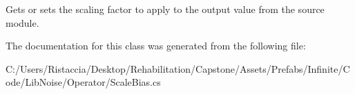 Gets or sets the scaling factor to apply to the output value from the source module. 



The documentation for this class was generated from the following file\+:\begin{DoxyCompactItemize}
\item 
C\+:/\+Users/\+Ristaccia/\+Desktop/\+Rehabilitation/\+Capstone/\+Assets/\+Prefabs/\+Infinite/\+Code/\+Lib\+Noise/\+Operator/Scale\+Bias.\+cs\end{DoxyCompactItemize}

